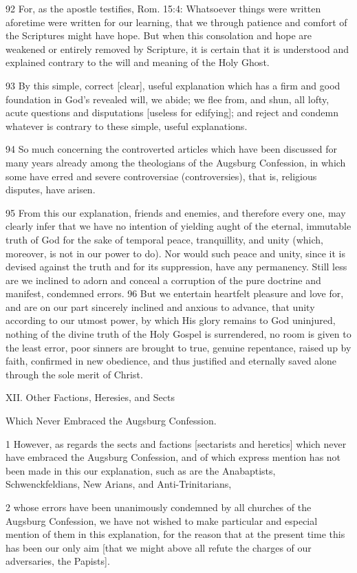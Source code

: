 {92 For, as the apostle testifies, Rom. 15:4: Whatsoever things were written aforetime were written for our learning, that we through patience and comfort of the Scriptures might have hope. But when this consolation and hope are weakened or entirely removed by Scripture, it is certain that it is understood and explained contrary to the will and meaning of the Holy Ghost.

93 By this simple, correct [clear], useful explanation which has a firm and good foundation in God’s revealed will, we abide; we flee from, and shun, all lofty, acute questions and disputations [useless for edifying]; and reject and condemn whatever is contrary to these simple, useful explanations.

94 So much concerning the controverted articles which have been discussed for many years already among the theologians of the Augsburg Confession, in which some have erred and severe controversiae (controversies), that is, religious disputes, have arisen.

95 From this our explanation, friends and enemies, and therefore every one, may clearly infer that we have no intention of yielding aught of the eternal, immutable truth of God for the sake of temporal peace, tranquillity, and unity (which, moreover, is not in our power to do). Nor would such peace and unity, since it is devised against the truth and for its suppression, have any permanency. Still less are we inclined to adorn and conceal a corruption of the pure doctrine and manifest, condemned errors.
96 But we entertain heartfelt pleasure and love for, and are on our part sincerely inclined and anxious to advance, that unity according to our utmost power, by which His glory remains to God uninjured, nothing of the divine truth of the Holy Gospel is surrendered, no room is given to the least error, poor sinners are brought to true, genuine repentance, raised up by faith, confirmed in new obedience, and thus justified and eternally saved alone through the sole merit of Christ.

XII. Other Factions, Heresies, and Sects

Which Never Embraced the Augsburg Confession.

1 However, as regards the sects and factions [sectarists and heretics] which never have embraced the Augsburg Confession, and of which express mention has not been made in this our explanation, such as are the Anabaptists, Schwenckfeldians, New Arians, and Anti-Trinitarians,

2 whose errors have been unanimously condemned by all churches of the Augsburg Confession, we have not wished to make particular and especial mention of them in this explanation, for the reason that at the present time this has been our only aim [that we might above all refute the charges of our adversaries, the Papists].

}
